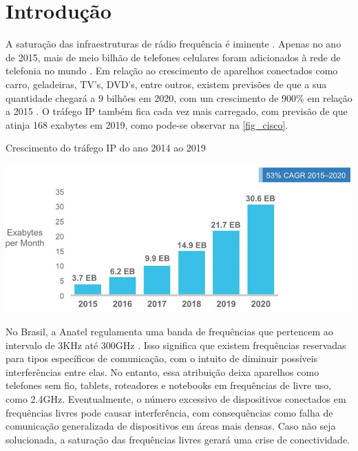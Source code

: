 	\chapter*[Introdução]{Introdução} %
		
	A saturação das infraestruturas de rádio frequência é iminente \cite{load-balancing}. Apenas no ano de 2015, mais de meio bilhão de telefones celulares foram adicionados à rede de telefonia no mundo \cite{cisco-forecast}. Em relação ao crescimento de aparelhos conectados como carro, geladeiras, TV’s, DVD’s, entre outros, existem previsões de que a sua quantidade chegará a 9 bilhões em 2020, com um crescimento de 900\% em relação a 2015 \cite{erricson-report}. O tráfego IP também fica cada vez mais carregado, com previsão de que atinja 168 exabytes em 2019, como pode-se observar na \autoref{fig_cisco}.
	
	\begin{chart}[ht!]
		\caption{\label{fig_cisco}Crescimento do tráfego IP do ano 2014 ao 2019}
		\begin{center}
			\includegraphics[scale=0.5]{cisco_exabytes_per_month.png}
		\end{center}
	\end{chart}
	
	No Brasil, a Anatel regulamenta uma banda de frequências que pertencem ao intervalo  de 3KHz até 300GHz \cite{faixa-anatel}. Isso significa que existem frequências reservadas para tipos específicos de comunicação, com o intuito de diminuir possíveis interferências entre elas. No entanto, essa atribuição deixa aparelhos como telefones sem fio, tablets, roteadores e notebooks em frequências de livre uso, como 2.4GHz. Eventualmente, o número excessivo de dispositivos conectados em  frequências livres pode causar interferência, com consequências como falha de comunicação generalizada de dispositivos em áreas mais densas. Caso não seja solucionada, a saturação das frequências livres gerará uma crise de conectividade. \par 
	
